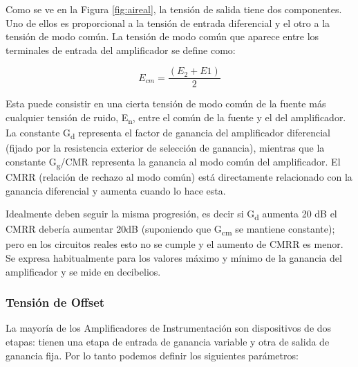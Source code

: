 Como se ve en la Figura \ref{fig:aireal}, la tensión de salida tiene dos componentes. Uno de ellos es proporcional a la tensión de entrada diferencial y el otro a la tensión de modo común. La tensión de modo común que aparece entre los terminales de entrada del amplificador se define como: 

\begin{equation}\label{eq6}
E_{cm} = \frac{(E_{2}+E{1})}{2}
\end{equation}

Esta puede consistir en una cierta tensión de modo común de la fuente más cualquier tensión de ruido, E\textsubscript{n}, entre el común de la fuente y el del amplificador. La constante G\textsubscript{d} representa el factor de ganancia del amplificador diferencial (fijado por la resistencia exterior de selección de ganancia), mientras que la constante G\textsubscript{g}/CMR representa la ganancia al modo común del amplificador. El CMRR (relación de rechazo al modo común) está directamente relacionado con la ganancia diferencial y aumenta cuando lo hace esta. 

Idealmente deben seguir la misma progresión, es decir si G\textsubscript{d} aumenta 20 dB el CMRR debería aumentar 20dB (suponiendo que G\textsubscript{cm} se mantiene constante); pero en los circuitos reales esto no se cumple y el aumento de CMRR es menor. Se expresa habitualmente para los valores máximo y mínimo de la ganancia del amplificador y se mide en decibelios.


\subsubsection{Tensión de Offset} %
\label{tension_off}
La mayoría de los Amplificadores de Instrumentación son dispositivos de dos etapas: tienen una etapa de entrada de ganancia variable y otra de salida de ganancia fija. Por lo tanto podemos definir los siguientes parámetros:

